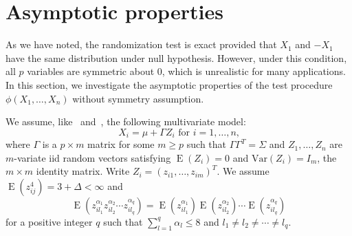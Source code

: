 \documentclass[3p]{elsarticle}
\DeclareMathOperator{\myE}{E}
\theoremstyle{plain}
\theoremstyle{definition}
\theoremstyle{remark}
\begin{document}
%

\section{Asymptotic properties}
As we have noted, the randomization test is exact provided that $X_1$ and $-X_1$ have the same distribution under null hypothesis.
However, under this condition, all $p$ variables are symmetric about $0$, which is unrealistic for many applications.
In this section, we investigate the asymptotic properties of the test procedure $\phi(X_1,\ldots,X_n)$ without symmetry assumption.

We assume, like~\citet{Chen2010A} and~\citet{Bai1996Efiect}, the following multivariate model:
\begin{equation}\label{chenC1}
    \textrm{$X_i=\mu+\Gamma Z_i$  for  $i=1,\ldots,n$,}
\end{equation}
where $\Gamma$ is a $p\times m$ matrix for some $m\geq p$ such that $\Gamma\Gamma^T=\Sigma$ and $Z_{1},\ldots, Z_n$ are $m$-variate iid random vectors satisfying $\myE(Z_i)=0$ and $\mathrm{Var}(Z_i)=I_m$, the $m\times m$ identity matrix. Write $Z_i={(z_{i1},\ldots,z_{im})}^T$. We assume $\myE(z_{ij}^4)=3+\Delta<\infty$ and
\begin{equation}\label{chenC2}
    \myE(z_{il_1}^{\alpha_1}z_{il_2}^{\alpha_2}\cdots z_{il_q}^{\alpha_q})=\myE(z_{il_1}^{\alpha_1})\myE(z_{il_2}^{\alpha_2})\cdots \myE(z_{il_q}^{\alpha_q})
\end{equation}
for a positive integer $q$ such that $\sum_{l=1}^q \alpha_l\leq 8$ and $l_1\neq l_2\neq \cdots \neq l_q$.
\end{document}
